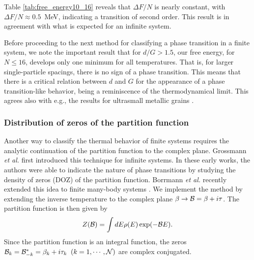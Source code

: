 \documentclass[preprint,rmp,aps,floatfix]{revtex4}
\begin{document}
Table \ref{tab:free_energy10_16} reveals that $\Delta F/N$ is nearly
constant, with  $\Delta F/N\approx 0.5$~MeV, indicating a 
transition of second order. This result is in 
agreement with what is expected for an infinite system. 

Before proceeding to the next method for classifying a phase transition
in a finite system, we note the important result that for $d/G > 1.5$, 
our free energy, for $N\le 16$, develops
only one minimum for all temperatures. That is, for larger single-particle
spacings, there is no sign of a phase transition. This means that there
is a critical relation between $d$ and $G$ for the appearance of a phase 
transition-like behavior, being a  reminiscence of the thermodynamical limit.
This agrees also with e.g., the results for ultrasmall metallic grains
\cite{delft2000}. 

\subsubsection{Distribution of zeros of the partition function}

\label{subsec:doz}

Another way to classify the thermal behavior of finite systems 
requires the analytic continuation of the partition function to the
complex plane. Grossmann {\it et al.} \cite{gr67,gr69,gl69} first 
introduced this technique for infinite systems. In these early works,
the authors were able to indicate the nature of phase transitions 
by studying the density of zeros (DOZ) of the partition function. 
Borrmann {\it et al.} recently extended this idea to finite many-body
systems \cite{bmh00}. We implement the method by extending 
the inverse temperature to the complex plane $\beta \rightarrow {\cal B}=
\beta +i\tau$. The partition function is then given by
\begin{equation}
Z({\cal B})= \int dE \rho(E) \exp(-{\cal B}E).
\end{equation}
Since the partition function is an integral function, the zeros 
${\cal B}_k = {\cal B}_{-k}^*=\beta_k + i\tau_k \;\; (k =1,\cdots, {\cal N})$
are complex conjugated. 
\end{document}
